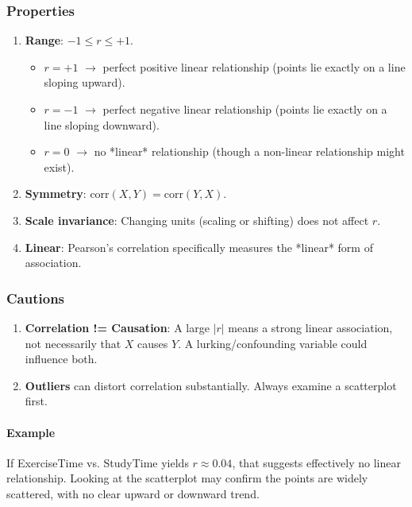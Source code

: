 \documentclass[10pt]{extarticle}
\begin{document}
\subsubsection{Properties}

\begin{enumerate}
    \item \textbf{Range}: $-1 \le r \le +1$.
          \begin{itemize}
              \item $r = +1$ $\rightarrow$ perfect positive linear relationship (points lie exactly on a line sloping upward).
              \item $r = -1$ $\rightarrow$ perfect negative linear relationship (points lie exactly on a line sloping downward).
              \item $r = 0$ $\rightarrow$ no *linear* relationship (though a non-linear relationship might exist).
          \end{itemize}
    \item \textbf{Symmetry}: $\text{corr}(X, Y) = \text{corr}(Y, X)$.
    \item \textbf{Scale invariance}: Changing units (scaling or shifting) does not affect $r$.
    \item \textbf{Linear}: Pearson's correlation specifically measures the *linear* form of association.
\end{enumerate}

\subsubsection{Cautions}

\begin{enumerate}
    \item \textbf{Correlation != Causation}: A large $|r|$ means a strong linear association, not necessarily that $X$ causes $Y$. A lurking/confounding variable could influence both.
    \item \textbf{Outliers} can distort correlation substantially. Always examine a scatterplot first.
\end{enumerate}

\paragraph{Example} If ExerciseTime vs. StudyTime yields $r \approx 0.04$, that suggests effectively no linear relationship. Looking at the scatterplot may confirm the points are widely scattered, with no clear upward or downward trend.
\end{document}
